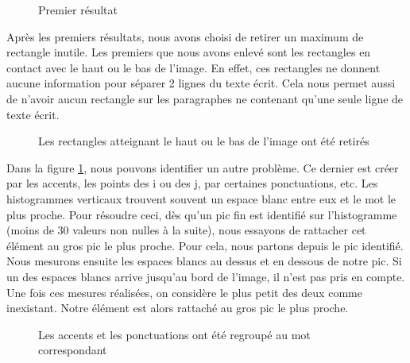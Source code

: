 \documentclass[12pt,a4paper]{article}
\begin{document}
\begin{figure}[!h]
\centering
    \caption{Premier résultat}
\end{figure}

Après les premiers résultats, nous avons choisi de retirer un maximum de rectangle inutile. Les premiers que nous avons enlevé sont les rectangles en contact avec le haut ou le bas de l'image. En effet, ces rectangles ne donnent aucune information pour séparer 2 lignes du texte écrit. Cela nous permet aussi de n'avoir aucun rectangle sur les paragraphes ne contenant qu'une seule ligne de texte écrit.\bigbreak

\begin{figure}[!h]
\centering
    \caption{Les rectangles atteignant le haut ou le bas de l'image ont été retirés}
    \label{img:notopnobottomrect}
\end{figure}

Dans la figure \ref{img:notopnobottomrect}, nous pouvons identifier un autre problème. Ce dernier est créer par les accents, les points des \og i\fg{} ou des \og j\fg, par certaines ponctuations, etc. Les histogrammes verticaux trouvent souvent un espace blanc entre eux et le mot le plus proche. Pour résoudre ceci, dès qu'un pic fin est identifié sur l'histogramme (moins de 30 valeurs non nulles à la suite), nous essayons de rattacher cet élément au gros pic le plus proche.\bigbreak
Pour cela, nous partons depuis le pic identifié. Nous mesurons ensuite les espaces blancs au dessus et en dessous de notre pic. Si un des espaces blancs arrive jusqu'au bord de l'image, il n'est pas pris en compte. Une fois ces mesures réalisées, on considère le plus petit des deux comme inexistant. Notre élément est alors rattaché au gros pic le plus proche.\bigbreak

\begin{figure}[!h]
\centering
    \caption{Les accents et les ponctuations ont été regroupé au mot correspondant}
\end{figure}
\end{document}
